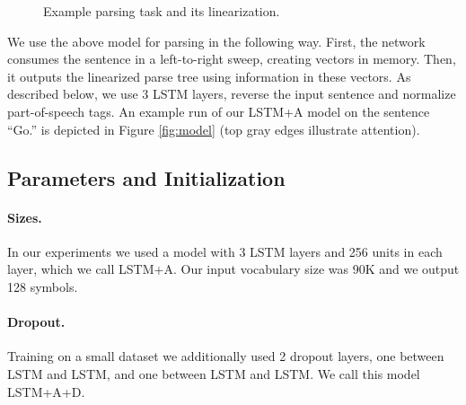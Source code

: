 \documentclass{article} \usepackage{nips15submit_e,times}
\begin{document}
\begin{figure}
  \begin{center}
  \end{center}
  \caption{Example parsing task and its linearization.}
  \label{fig:task-example}
\end{figure}

We use the above model for parsing in the following way.
First, the network consumes the sentence in a left-to-right sweep,
creating vectors in memory. Then, it outputs the linearized parse tree
using information in these vectors. As described below, we use 3 LSTM layers,
reverse the input sentence and normalize part-of-speech tags.
An example run of our LSTM+A model on the sentence ``Go.'' is depicted in
Figure \ref{fig:model} (top gray edges illustrate attention).

\subsection{Parameters and Initialization}

\paragraph{Sizes.}
In our experiments we used a model with 3 LSTM layers and 256 units
in each layer, which we call LSTM+A. Our input vocabulary size was 90K
and we output 128 symbols.

\paragraph{Dropout.}
Training on a small dataset we additionally used 2 dropout layers, one
between LSTM and LSTM, and one between LSTM and LSTM.
We call this model LSTM+A+D.
\end{document}
